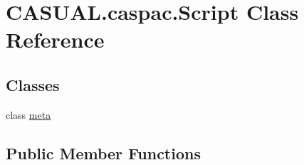 \hypertarget{classCASUAL_1_1caspac_1_1Script}{\section{C\-A\-S\-U\-A\-L.\-caspac.\-Script Class Reference}
\label{classCASUAL_1_1caspac_1_1Script}
}
\subsection*{Classes}
\begin{DoxyCompactItemize}
\item 
class \hyperlink{classCASUAL_1_1caspac_1_1Script_1_1meta}{meta}
\end{DoxyCompactItemize}
\subsection*{Public Member Functions}

